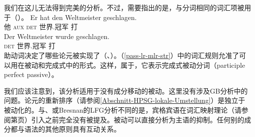 我们在这儿无法得到完美的分析。不过，需要指出的是，与分词相同的词汇项被用于（）。
\eal
\ex 
\gll Er hat den Weltmeister geschlagen.\\
	 他 \textsc{aux} \textsc{det} 世界.冠军 打\\
\ex 
\gll Der Weltmeister wurde geschlagen.\\
	 \textsc{det} 世界.冠军 \passivepst{} 打\\
\zl
助动词决定了哪些论元被实现了（\citealp{Haider86}、\citealp[\S~17]{MuellerLehrbuch1}）。（\ref{pass-lr-mlr-str}）中的词汇规则允准了可以用在被动和完成式中的形式。这样，\vformvc 属于，它表示完成式被动分词（participle perfect passive）。

我们应该注意到，该分析适用于没有成分移动的被动。这里没有涉及GB分析中的问题\indexgbc。论元的重新排序（请参阅\ref{Abschnitt-HPSG-lokale-Umstellung}）是独立于被动化的。与\gpsgc、\cgc 或Bresnan的LFG分析\indexlfgc 不同的是，宾格宾语在词汇映射理论（请参阅第\pageref{page-LMT}页）引入之前完全没有被提及。被动可以直接分析为主语的抑制。任何别的成分都与语法的其他原则具有互动关系。

